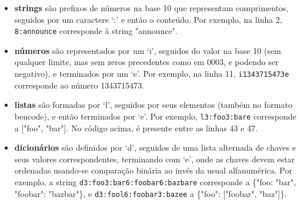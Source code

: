 \begin{itemize}
    \item \textbf{\glspl*{string}} são prefixos de números na base 10 que representam
        comprimentos, seguidos por um caractere `:' e então o conteúdo. Por exemplo, na
        linha 2, \verb|8:announce| corresponde à \gls*{string} "announce".

    \item \textbf{números} são representados por um `i', seguidos do valor na base 10
        (sem qualquer limite, mas sem zeros precedentes como em $0003$, e podendo ser
        negativo), e terminados por um `e'. Por exemplo, na linha 11,
        \verb|i1343715473e| corresponde ao número 1343715473.

    \item \textbf{listas} são formadas por `l', seguidos por seus elementos (também no
        formato \gls*{bencode}), e então terminados por `e'. Por exemplo,
        \verb|l3:foo3:bare| corresponde a ["foo", "bar"]. No código acima, é presente
        entre as linhas 43 e 47.

    \item \textbf{dicionários} são definidos por `d', seguidos de uma lista alternada
        de chaves e seus valores correspondentes, terminando com `e', onde as chaves
        devem estar ordenadas usando-se comparação binária ao invés da usual
        alfanumérica. Por exemplo, a \gls*{string} \verb|d3:foo3:bar6:foobar6:bazbare|
        corresponde a \{"foo: "bar", "foobar": "bazbar"\}, e
        \verb|d3:fool6:foobar3:bazee| a \{"foo": ["foobar", "baz"]\}.
\end{itemize}

